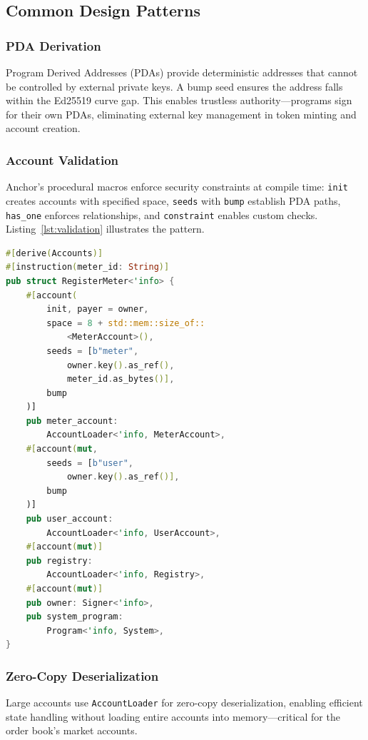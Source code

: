 \documentclass[conference]{IEEEtran}
\begin{document}
\subsection{Common Design Patterns}

\subsubsection{PDA Derivation}
Program Derived Addresses (PDAs) provide deterministic addresses that cannot be controlled by external private keys. A bump seed ensures the address falls within the Ed25519 curve gap. This enables trustless authority---programs sign for their own PDAs, eliminating external key management in token minting and account creation.

\subsubsection{Account Validation}
Anchor's procedural macros enforce security constraints at compile time: \texttt{init} creates accounts with specified space, \texttt{seeds} with \texttt{bump} establish PDA paths, \texttt{has\_one} enforces relationships, and \texttt{constraint} enables custom checks. Listing~\ref{lst:validation} illustrates the pattern.

\begin{lstlisting}[language=Rust, caption={Declarative account validation for meter registration (from \texttt{registry/src/lib.rs})}, label={lst:validation}, float=htbp]
#[derive(Accounts)]
#[instruction(meter_id: String)]
pub struct RegisterMeter<'info> {
    #[account(
        init, payer = owner,
        space = 8 + std::mem::size_of::
            <MeterAccount>(),
        seeds = [b"meter",
            owner.key().as_ref(),
            meter_id.as_bytes()],
        bump
    )]
    pub meter_account:
        AccountLoader<'info, MeterAccount>,
    #[account(mut,
        seeds = [b"user",
            owner.key().as_ref()],
        bump
    )]
    pub user_account:
        AccountLoader<'info, UserAccount>,
    #[account(mut)]
    pub registry:
        AccountLoader<'info, Registry>,
    #[account(mut)]
    pub owner: Signer<'info>,
    pub system_program:
        Program<'info, System>,
}
\end{lstlisting}

\subsubsection{Zero-Copy Deserialization}
Large accounts use \texttt{AccountLoader} for zero-copy deserialization, enabling efficient state handling without loading entire accounts into memory---critical for the order book's market accounts.
\end{document}
